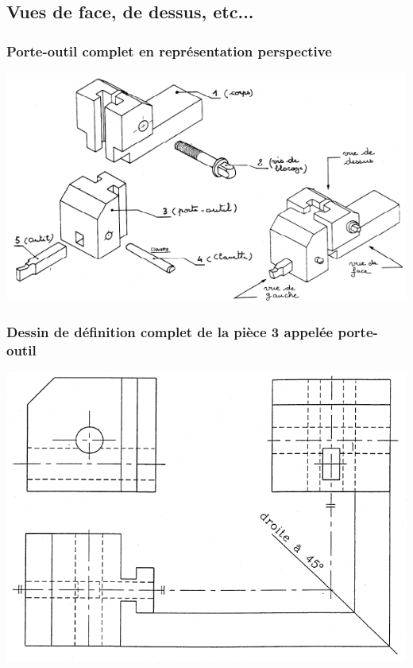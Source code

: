 \documentclass[11pt,oneside]{article}
\begin{document}
\subsection{Vues de face, de dessus, etc...}

\subsubsection{Porte-outil complet en représentation perspective}
\begin{center}
\includegraphics[width=.9\textwidth]{png/fig9}
\end{center}

\subsubsection{Dessin de définition complet de la pièce 3 appelée porte-outil}

\begin{center}
\includegraphics[width=.9\textwidth]{png/fig10}
\end{center}
\end{document}
